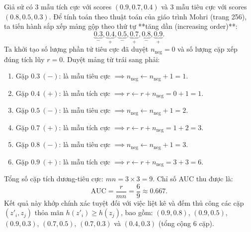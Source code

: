 \begin{example}
Giả sử có 3 mẫu tích cực với scores $(0.9, 0.7, 0.4)$ và 3 mẫu tiêu cực với scores $(0.8, 0.5, 0.3)$. Để tính toán theo thuật toán của giáo trình Mohri (trang 256), ta tiến hành sắp xếp mảng gộp theo thứ tự **tăng dần (increasing order)**:
\[
    \underbrace{0.3}_{-}, \underbrace{0.4}_{+}, \underbrace{0.5}_{-}, \underbrace{0.7}_{+}, \underbrace{0.8}_{-}, \underbrace{0.9}_{+}.
\]
Ta khởi tạo số lượng phần tử tiêu cực đã duyệt $n_{\text{neg}} = 0$ và số lượng cặp xếp đúng tích lũy $r = 0$. Duyệt mảng từ trái sang phải:
\begin{enumerate}
    \item Gặp $0.3 \ (-)$: là mẫu tiêu cực $\implies n_{\text{neg}} \leftarrow n_{\text{neg}} + 1 = 1$.
    \item Gặp $0.4 \ (+)$: là mẫu tích cực $\implies r \leftarrow r + n_{\text{neg}} = 0 + 1 = 1$.
    \item Gặp $0.5 \ (-)$: là mẫu tiêu cực $\implies n_{\text{neg}} \leftarrow n_{\text{neg}} + 1 = 2$.
    \item Gặp $0.7 \ (+)$: là mẫu tích cực $\implies r \leftarrow r + n_{\text{neg}} = 1 + 2 = 3$.
    \item Gặp $0.8 \ (-)$: là mẫu tiêu cực $\implies n_{\text{neg}} \leftarrow n_{\text{neg}} + 1 = 3$.
    \item Gặp $0.9 \ (+)$: là mẫu tích cực $\implies r \leftarrow r + n_{\text{neg}} = 3 + 3 = 6$.
\end{enumerate}
Tổng số cặp tích dương-tiêu cực: $mn = 3 \times 3 = 9$. Chỉ số AUC thu được là:
\[
    \mathrm{AUC} = \frac{r}{mn} = \frac{6}{9} \approx 0.667.
\]
Kết quả này khớp chính xác tuyệt đối với việc liệt kê và đếm thủ công các cặp $(z'_i, z_j)$ thỏa mãn $h(z'_i) \ge h(z_j)$, bao gồm: $(0.9, 0.8)$, $(0.9, 0.5)$, $(0.9, 0.3)$, $(0.7, 0.5)$, $(0.7, 0.3)$ và $(0.4, 0.3)$ (tổng cộng $6$ cặp).
\end{example}

